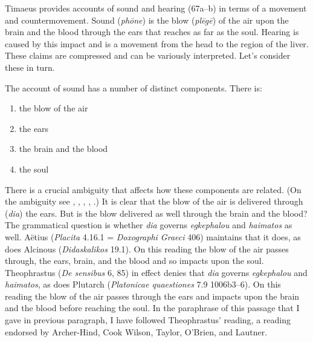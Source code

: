 Timaeus provides accounts of sound and hearing (67a--b) in terms of a movement and countermovement. Sound (\emph{phōne}) is the blow (\emph{plēgē}) of the air upon the brain and the blood through the ears that reaches as far as the soul. Hearing is caused by this impact and is a movement from the head to the region of the liver. These claims are compressed and can be variously interpreted. Let's consider these in turn.

The account of sound has a number of distinct components. There is:
\begin{enumerate}[(1)]
	\item the blow of the air
	\item the ears
	\item the brain and the blood
	\item the soul
\end{enumerate}

There is a crucial ambiguity that affects how these components are related. (On the ambiguity see \citealt[246 n7]{Archer-Hind:1888qd}, \citealt[99--100]{Cook-Wilson:1889cs}, \citealt[476--7]{Taylor:1928qb}, \citealt[142 n38]{OBrien:1984ji}, \citealt[235, n1]{Lautner:2005aa}.) It is clear that the blow of the air is delivered through (\emph{dia}) the ears. But is the blow delivered as well through the brain and the blood? The grammatical question is whether \emph{dia} governs \emph{egkephalou} and \emph{haimatos} as well. Aëtius (\emph{Placita} 4.16.1 = \emph{Doxographi Graeci} 406) maintains that it does, as does Alcinous (\emph{Didaskalikos} 19.1). On this reading the blow of the air passes through, the ears, brain, and the blood and so impacts upon the soul. Theophrastus (\emph{De sensibus} 6, 85) in effect denies that \emph{dia} governs \emph{egkephalou} and \emph{haimatos}, as does Plutarch (\emph{Platonicae quaestiones} 7.9 1006b3--6). On this reading the blow of the air passes through the ears and impacts upon the brain and the blood before reaching the soul. In the paraphrase of this passage that I gave in previous paragraph, I have followed Theophrastus' reading, a reading endorsed by Archer-Hind, Cook Wilson, Taylor, O'Brien, and Lautner. 


